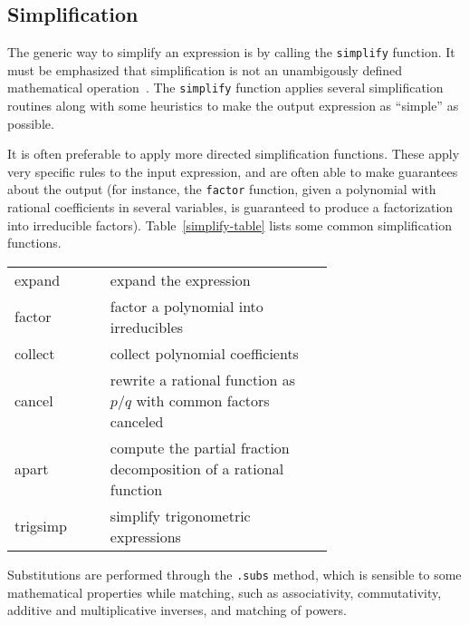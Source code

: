 




\subsection{Simplification}

The generic way to simplify an expression is by calling the \texttt{simplify}
function.
It must be emphasized that simplification is not an unambigously defined
mathematical operation~\cite{Carette2004understanding}.
The \texttt{simplify} function applies several simplification routines along
with some heuristics to make the output expression as ``simple'' as possible.

It is often preferable to apply more directed simplification functions. These
apply very specific rules to the input expression, and are often able to make
guarantees about the output (for instance, the \texttt{factor} function, given
a polynomial with rational coefficients in several variables, is guaranteed to
produce a factorization into irreducible factors).
Table~\ref{simplify-table} lists some common simplification functions.

\label{simplify-table}
\begin{tabular}{l|p{0.7\linewidth}}
expand & expand the expression \\
factor & factor a polynomial into irreducibles \\
collect & collect polynomial coefficients \\
cancel & rewrite a rational function as $p/q$ with common factors canceled \\
apart & compute the partial fraction decomposition of a rational function \\
trigsimp & simplify trigonometric expressions~\cite{fu2006automated} \\
\end{tabular}

Substitutions are performed through the \texttt{.subs} method, which is
sensible to some mathematical properties while matching, such as
associativity, commutativity, additive and multiplicative inverses, and
matching of powers.



